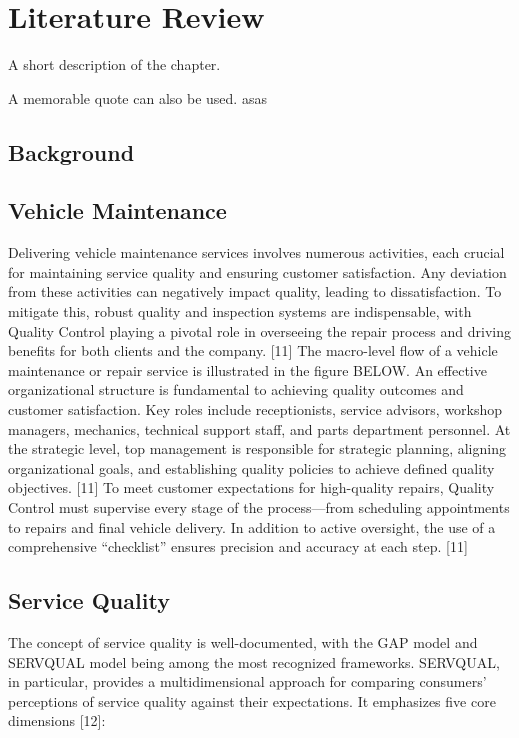 \chapter{Literature Review}%
\label{chapter:literatureReview}

\begin{introduction}
A short description of the chapter.

A memorable quote can also be used. asas
\end{introduction} 


\section{Background}


\section{Vehicle Maintenance}

Delivering vehicle maintenance services involves numerous activities, each crucial for maintaining service quality and ensuring customer satisfaction. Any deviation from these activities can negatively impact quality, leading to dissatisfaction. To mitigate this, robust quality and inspection systems are indispensable, with Quality Control playing a pivotal role in overseeing the repair process and driving benefits for both clients and the company. [11]
The macro-level flow of a vehicle maintenance or repair service is illustrated in the figure BELOW. An effective organizational structure is fundamental to achieving quality outcomes and customer satisfaction. Key roles include receptionists, service advisors, workshop managers, mechanics, technical support staff, and parts department personnel. At the strategic level, top management is responsible for strategic planning, aligning organizational goals, and establishing quality policies to achieve defined quality objectives. [11]
To meet customer expectations for high-quality repairs, Quality Control must supervise every stage of the process—from scheduling appointments to repairs and final vehicle delivery. In addition to active oversight, the use of a comprehensive “checklist” ensures precision and accuracy at each step. [11]

\section{Service Quality}
The concept of service quality is well-documented, with the GAP model and SERVQUAL model being among the most recognized frameworks. SERVQUAL, in particular, provides a multidimensional approach for comparing consumers’ perceptions of service quality against their expectations. It emphasizes five core dimensions [12]:

